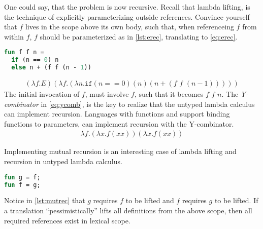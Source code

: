 \documentclass[11pt,oneside,a4paper]{report}
\begin{document}
One could say, that the problem is now recursive.
Recall that lambda lifting, is the technique of explicitly parameterizing outside references.
Convince yourself that $f$ lives in the scope above its own body, such that, when referenceing $f$ from within $f$, $f$ should be parameterized as in \autoref{lst:erec}, translating to \autoref{eq:erec}.
\begin{lstlisting}[language=ML,caption={Explicitly passing recursive function},label={lst:erec},xleftmargin=.32\textwidth]
fun f f n = 
  if (n == 0) n
  else n + (f f (n - 1))
\end{lstlisting}
\begin{align}
    (\lambda f . E) (\lambda f . (\lambda n . \texttt{if} (n == 0) (n) (n + (f \,\, f \,\, (n - 1)))))
    \label{eq:erec}
\end{align}
The initial invocation of $f$, must involve $f$, such that it becomes $f \,\, f \,\, n$.
The \textit{Y-combinator} in \autoref{eq:ycomb}, is the key to realize that the untyped lambda calculus can implement recursion.
Languages with functions and support binding functions to parameters, can implement recursion with the Y-combinator.
\begin{align}
    \lambda f . (\lambda x . f (x x)) (\lambda x . f (x x))
    \label{eq:ycomb}
\end{align}

Implementing mutual recursion is an interesting case of lambda lifting and recursion in untyped lambda calculus.
\begin{lstlisting}[language=ML,caption={Mutual recursion},label={lst:mutrec},xleftmargin=.32\textwidth]
fun g = f;
fun f = g;
\end{lstlisting}
Notice in \autoref{lst:mutrec} that $g$ requires $f$ to be lifted and $f$ requires $g$ to be lifted.
If a translation ``pessimistically'' lifts all definitions from the above scope, then all required references exist in lexical scope.
\end{document}
